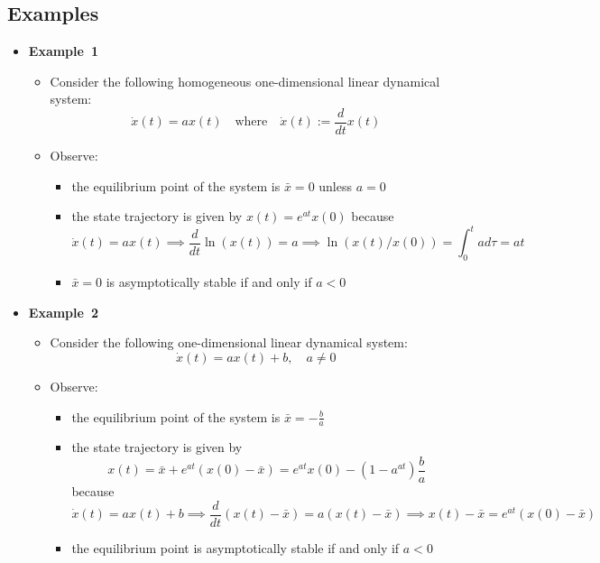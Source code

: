 \documentclass[12pt,a4paper]{article}
\begin{document}
\subsection{Examples}

\begin{itemize}

\item \textbf{Example~1}
  \begin{itemize}
  \item Consider the following homogeneous one-dimensional linear dynamical system:
    \begin{equation}\nonumber%
      \dot{x}(t) = a x(t) \quad\text{where}\quad \dot{x}(t):= \frac{d}{dt}x(t)
    \end{equation}
  \item Observe:
    \begin{itemize}
    \item the equilibrium point of the system is $\bar{x}=0$ unless $a=0$
    \item the state trajectory is given by $x(t) = e^{a t} x(0)$ because
      \begin{equation}\nonumber%
        \dot{x}(t) = a x(t)
        \implies
        \frac{d}{dt} \ln(x(t)) = a
        \implies
        \ln(x(t)/x(0)) = \int_{0}^{t}ad\tau = at
      \end{equation}
    \item $\bar{x}=0$ is asymptotically stable if and only if $a<0$
    \end{itemize}
  \end{itemize}

\item \textbf{Example~2}
  \begin{itemize}
  \item Consider the following one-dimensional linear dynamical system:
    \begin{equation}\nonumber%
      \dot{x}(t) = a x(t) + b, \quad a \neq 0
    \end{equation}
  \item Observe:
    \begin{itemize}
    \item the equilibrium point of the system is $\bar{x}= -\frac{b}{a}$
    \item the state trajectory is given by
      \begin{equation}\nonumber%
       x(t)= \bar{x} + e^{a t}(x(0)-\bar{x})  = e^{at}x(0) - \left(1 - a^{at}\right)\frac{b}{a}
     \end{equation}
     because
      \begin{equation}\nonumber%
        \dot{x}(t) = a x(t) + b
        \implies
        \frac{d}{dt}\left(x(t)-\bar{x}\right) = a (x(t)-\bar{x})
        \implies
        x(t)-\bar{x} = e^{a t}(x(0)-\bar{x})
      \end{equation}
    \item the equilibrium point is asymptotically stable if and only if $a<0$
    \end{itemize}
  \end{itemize}


\end{itemize}
\end{document}
